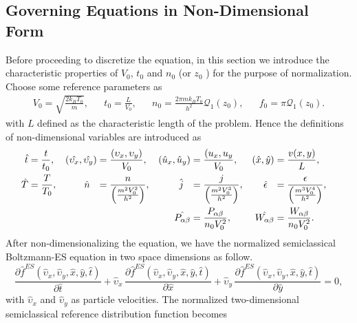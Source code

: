 \documentclass{rsproca}%
\begin{document}
\subsection{Governing Equations in Non-Dimensional Form}
\label{subsec:3_1}
Before proceeding to discretize the equation, in this section we introduce the characteristic properties of $V_0$, $t_0$ and $n_0$ (or $z_0$ ) for the purpose of normalization.  Choose some reference parameters as
\begin{align}
&V_0 = \sqrt{\frac{2k_B T_0}{m}},& &t_0 = \frac{L}{V_0},& &n_{0} = \frac{2 \pi m k_B T_0}{h^2} \mathcal{Q}_1 (z_0),& &f_0=\pi \mathcal{Q}_1(z_0).&
\end{align}
with $L$ defined as the characteristic length of the problem. Hence the definitions of non-dimensional variables are introduced as
\begin{subequations}
\begin{align}
\hat{t} &=\frac{t}{t_0},& (\hat{\upsilon_x}, \hat{\upsilon_y})&=\frac{(\upsilon_x,\upsilon_y)}{V_0},&
(\hat{u}_x,\hat{u}_y)&=\frac{(u_x,u_y}{V_0},& (\hat{x},\hat{y})&=\frac{v(x, y)}{L},& \\
\hat{T}&=\frac{T}{T_0},& \hat{n}\hspace{0.1in}&=\frac{n}{\left(\frac{m^2V_0^2}{h^2}\right)},&
\hat{j}\hspace{0.1in}&=\frac{j}{\left(\frac{m^2V_{0}^3}{h^2}\right) },& \hat{\epsilon}\hspace{0.1in}&=\frac{\epsilon}{\left(\frac{m^3 V_{0}^4}{h^2}\right)},& \\
& & & &\hat{P_{\alpha \beta}} &= \frac{P_{\alpha \beta}}{n_{0} V_{0}^2 },& \hat{W_{\alpha \beta}} &= \frac{W_{\alpha \beta}}{n_{0} V_0^2}.&
\end{align}
\end{subequations}
After non-dimensionalizing the equation, we have the normalized semiclassical Boltzmann-ES equation in two space dimensions as follow.
\begin{equation}
\frac{\partial\hat{f}^{ES}(\hat{\upsilon}_x,\hat{\upsilon}_y,\hat{x},\hat{y},\hat{t})}{\partial\hat{t}} + \hat{\upsilon}_x\,\frac{\partial\hat{f}^{ES}(\hat{\upsilon}_x,\hat{\upsilon}_y,\hat{x},\hat{y},\hat{t})}{\partial\hat{x}} + \hat{\upsilon}_y\,\frac{\partial\hat{f}^{ES}(\hat{\upsilon}_x,\hat{\upsilon}_y,\hat{x},\hat{y},\hat{t})}{\partial\hat{y}} = 0, 
\label{eq:normalized_B_ES_BGK_2D}
\end{equation}
with $\hat{\upsilon}_x$ and $\hat{\upsilon}_y$ as particle velocities. The normalized two-dimensional semiclassical reference distribution function becomes
\end{document}
